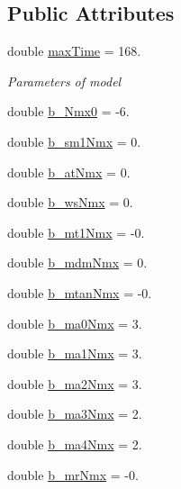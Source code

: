 \subsection*{Public Attributes}
\begin{DoxyCompactItemize}
\item 
double \mbox{\hyperlink{class_a_l_f_a_m_a0c0298445d03428301cd76870c188d3a}{max\+Time}} = 168.
\begin{DoxyCompactList}\small\item\em Parameters of model \end{DoxyCompactList}\item 
double \mbox{\hyperlink{class_a_l_f_a_m_a05ff3ab2a9a9b1b5a6fd8078beb26472}{b\+\_\+\+Nmx0}} = -\/6.
\item 
double \mbox{\hyperlink{class_a_l_f_a_m_af82b827a0da42f12e5ce566becd423dd}{b\+\_\+sm1\+Nmx}} = 0.
\item 
double \mbox{\hyperlink{class_a_l_f_a_m_af3dc4fb18cd6344d9ca1ab0087f89e73}{b\+\_\+at\+Nmx}} = 0.
\item 
double \mbox{\hyperlink{class_a_l_f_a_m_a3d28dab8a5760d1f70eaa6d2a2bfa3c2}{b\+\_\+ws\+Nmx}} = 0.
\item 
double \mbox{\hyperlink{class_a_l_f_a_m_a1371ff3a9982d7ac86efec70e56b2dc3}{b\+\_\+mt1\+Nmx}} = -\/0.
\item 
double \mbox{\hyperlink{class_a_l_f_a_m_a45ce98ac8aef559bc70ab1a17807d6c3}{b\+\_\+mdm\+Nmx}} = 0.
\item 
double \mbox{\hyperlink{class_a_l_f_a_m_abda46fb6febfc79bebea9db18a054799}{b\+\_\+mtan\+Nmx}} = -\/0.
\item 
double \mbox{\hyperlink{class_a_l_f_a_m_acd106a763271a835c77fc8f18c1d4f36}{b\+\_\+ma0\+Nmx}} = 3.
\item 
double \mbox{\hyperlink{class_a_l_f_a_m_a4054c5701c65765862b0bf221e52deca}{b\+\_\+ma1\+Nmx}} = 3.
\item 
double \mbox{\hyperlink{class_a_l_f_a_m_af01c1126b1045793b1f6485afb08b3a7}{b\+\_\+ma2\+Nmx}} = 3.
\item 
double \mbox{\hyperlink{class_a_l_f_a_m_a3fa227600312da4ba1120f619de41913}{b\+\_\+ma3\+Nmx}} = 2.
\item 
double \mbox{\hyperlink{class_a_l_f_a_m_a231390015fe7195be17e13001d7cdcc7}{b\+\_\+ma4\+Nmx}} = 2.
\item 
double \mbox{\hyperlink{class_a_l_f_a_m_a952800c1afba30c0b22c8d66bb0e7446}{b\+\_\+mr\+Nmx}} = -\/0.
\item 

\end{DoxyCompactItemize}
